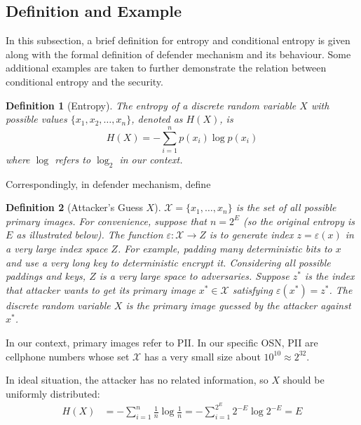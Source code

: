\documentclass[10pt, conference, compsocconf]{IEEEtran}
\newtheorem{mydef}{Definition}
\begin{document}
    \subsection{Definition and Example}
        In this subsection, a brief definition for entropy and conditional
        entropy is given along with the formal definition of defender mechanism
        and its behaviour.
        Some additional examples are taken to further
        demonstrate the relation between conditional entropy and
        the security.

        \begin{mydef}[Entropy\cite{entropy}]\label{def_entropy}
            The entropy of a discrete random variable $X$ with
            possible values $\{x_1, x_2, \ldots, x_n\}$, denoted as  $H(X)$, is
            \begin{equation}
                H(X) = -\sum_{i=1}^n p(x_i)\log p(x_i)
            \end{equation}
            where $\log$ refers to $\log_2$ in our context.
        \end{mydef}

        Correspondingly, in defender mechanism, define
        \begin{mydef}[Attacker's Guess $X$]\label{def2}
            $\mathcal{X} = \{x_1, \ldots, x_n\}$ is the set of all possible
            primary images.
            For convenience, suppose that $n = 2^E$ (so the original entropy is $E$ as illustrated below).
            The function $\varepsilon: \mathcal X \rightarrow Z$ is to generate index $z = \varepsilon(x)$
            in a very large index space $Z$. For example, padding many deterministic bits to $x$ and use
            a very long key to deterministic encrypt it. Considering all possible paddings
            and keys, $Z$ is a very large space to adversaries.
            Suppose $z^*$ is the index that attacker wants to
            get its primary image $x^* \in \mathcal{X}$ satisfying $\varepsilon(x^*) = z^*$.
            The discrete random variable $X$ is the
            primary image guessed by the attacker against $x^*$.
        \end{mydef}

        In our context, primary images refer to PII.
        In our specific OSN, PII are cellphone numbers
        whose set $\mathcal X$ has a very small
        size about $10^{10} \approx 2^{32}$.

        In ideal situation, the attacker has no related information, so $X$ should
        be uniformly distributed:
        \begin{align*}
            H(X) &= -\sum_{i=1}^{n} \frac{1}{n} \log \frac{1}{n}
                = -\sum_{i=1}^{2^E} 2^{-E} \log 2^{-E}
                = E
        \end{align*}
\end{document}
